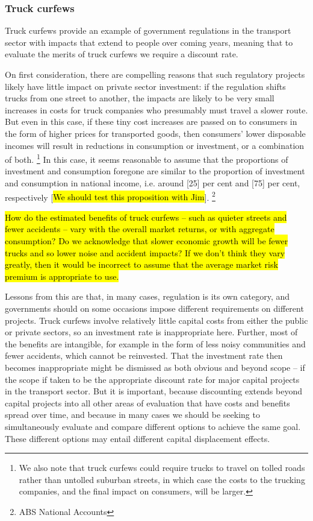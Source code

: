 \subsubsection{Truck curfews}

Truck curfews provide an example of government regulations in the transport sector with impacts that extend to people over coming years, meaning that to evaluate the merits of truck curfews we require a discount rate. 

On first consideration, there are compelling reasons that such regulatory projects likely have little impact on private sector investment: if the regulation shifts trucks from one street to another, the impacts are likely to be very small increases in costs for truck companies who presumably must travel a slower route. But even in this case, if these tiny cost increases are passed on to consumers in the form of higher prices for transported goods, then consumers' lower disposable incomes will result in reductions in consumption or investment, or a combination of both.%
    \footnote{We also note that truck curfews could require trucks to travel on tolled roads rather than untolled suburban streets, in which case the costs to the trucking companies, and the final impact on consumers, will be larger.}
In this case, it seems reasonable to assume that the proportions of investment and consumption foregone are similar to the proportion of investment and consumption in national income, i.e. around [25] per cent and [75] per cent, respectively [\hl{We should test this proposition with Jim}].%
    \footnote{ABS National Accounts}

\hl{How do the estimated benefits of truck curfews -- such as quieter streets and fewer accidents -- vary with the overall market returns, or with aggregate consumption? Do we acknowledge that slower economic growth will be fewer trucks and so lower noise and accident impacts?  If we don't think they vary greatly, then it would be incorrect to assume that the average market risk premium is appropriate to use.} 

Lessons from this are that, in many cases, regulation is its own category, and governments should on some occasions impose different requirements on different projects. Truck curfews involve relatively little capital costs from either the public or private sectors, so an investment rate is inappropriate here. Further, most of the benefits are intangible, for example in the form of less noisy communities and fewer accidents, which cannot be reinvested. That the investment rate then becomes inappropriate might be dismissed as both obvious and beyond scope – if the scope if taken to be the appropriate discount rate for major capital projects in the transport sector. But it is important, because discounting extends beyond capital projects into all other areas of evaluation that have costs and benefits spread over time, and because in many cases we should be seeking to simultaneously evaluate and compare different options to achieve the same goal. These different options may entail different capital displacement effects. 


